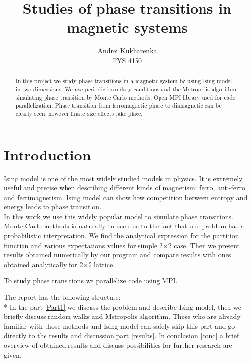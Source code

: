 \documentclass[10pt]{article}
\begin{document}
\setlength\parindent{1pt}
\title{Studies of phase transitions in magnetic systems}
\author{Andrei Kukharenka \\  
FYS 4150 
}

\maketitle
\begin{abstract}
In this project we study phase transitions in a magnetic system by using Ising model in two dimensions.
We use periodic boundary conditions and the Metropolis algorithm simulating phase transition by Monte Carlo methods.
Open MPI library used for code parallelization. Phase transition from ferromagnetic phase to diamagnetic can be clearly seen, however
finate size effects take place.

\end{abstract}
\clearpage 


\section{Introduction}
Ising model is one of the most widely studied models in physics. It is extremely useful and precise when describing different kinds of magnetism: ferro, anti-ferro and ferrimagnetism. Ising model can show how competition between entropy and energy leads to phase transition. \\
In this work we use this widely popular model to simulate phase transitions. Monte Carlo methods is naturally to use due to the fact that our problem has a probabilistic interpretation.
We find the analytical expression for the partition function and various expectations values for simple 2$\times$2 case.
Then we present results obtained numerically by our program and compare results with ones obtained analytically for 2$\times$2 lattice.

To study phase transitions we parallelize code using MPI.

The report has the following structure:\\*
In the part \ref{Part1}  we discuss the problem and describe Ising model, then we briefly discuss random walks and Metropolis algorithm. Those who are already familiar with those methods and Ising model can safely skip this part and go directly to the results and discussion part \ref{results}. In conclusion \ref{conc} a brief overview of obtained results and discuss possibilities for further research are given. 

 
\end{document}
